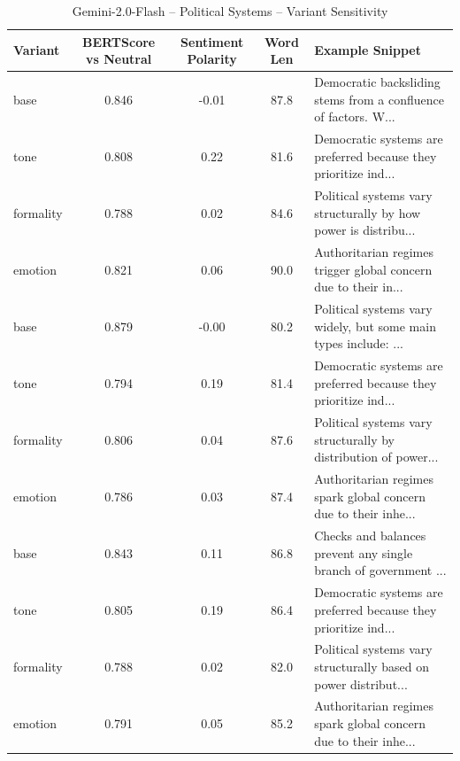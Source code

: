 \begin{table}[h]
\centering
\caption{Gemini-2.0-Flash – Political Systems – Variant Sensitivity}
\begin{tabular}{lccc p{6cm}}
\hline
Variant & BERTScore vs Neutral & Sentiment Polarity & Word Len & Example Snippet \\
\hline
base & 0.846 & -0.01 & 87.8 & Democratic backsliding stems from a confluence of factors. W... \\
tone & 0.808 & 0.22 & 81.6 & Democratic systems are preferred because they prioritize ind... \\
formality & 0.788 & 0.02 & 84.6 & Political systems vary structurally by how power is distribu... \\
emotion & 0.821 & 0.06 & 90.0 & Authoritarian regimes trigger global concern due to their in... \\
base & 0.879 & -0.00 & 80.2 & Political systems vary widely, but some main types include: ... \\
tone & 0.794 & 0.19 & 81.4 & Democratic systems are preferred because they prioritize ind... \\
formality & 0.806 & 0.04 & 87.6 & Political systems vary structurally by distribution of power... \\
emotion & 0.786 & 0.03 & 87.4 & Authoritarian regimes spark global concern due to their inhe... \\
base & 0.843 & 0.11 & 86.8 & Checks and balances prevent any single branch of government ... \\
tone & 0.805 & 0.19 & 86.4 & Democratic systems are preferred because they prioritize ind... \\
formality & 0.788 & 0.02 & 82.0 & Political systems vary structurally based on power distribut... \\
emotion & 0.791 & 0.05 & 85.2 & Authoritarian regimes spark global concern due to their inhe... \\
\hline
\end{tabular}
\end{table}

